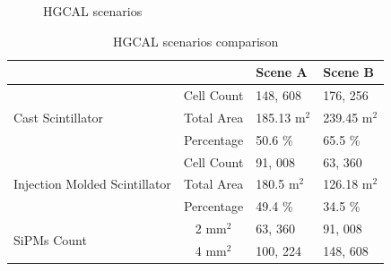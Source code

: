 \begin{figure}[!ht]
\begin{minipage}[c]{0.49\textwidth}
  \end{minipage}
  \caption[\gls{HGCAL} scenarios]{\gls{HGCAL} scenarios}%
  \label{fig:hgcal-scenes-fnal-jan20}
\end{figure}

\begin{table}[!ht]
  \centering
  \caption{\gls{HGCAL} scenarios comparison}
  \begin{tabular}{p{1.5in}cll}%
    \toprule
                                                   &                    & Scene A                & Scene B                \\
    \midrule
    \multirow{3}{=}{Cast Scintillator}             & Cell Count         & 148, 608               & 176, 256               \\
                                                   & Total Area         & 185.13 \(\text{m}^2 \) & 239.45 \(\text{m}^2 \) \\
                                                   & Percentage         & 50.6 \%                & 65.5 \%                \\
    \cmidrule(lr){2-4}
    \multirow{3}{=}{Injection Molded Scintillator} & Cell Count         & 91, 008                & 63, 360                \\
                                                   & Total Area         & 180.5 \(\text{m}^2 \)  & 126.18 \(\text{m}^2 \) \\
                                                   & Percentage         & 49.4 \%                & 34.5 \%                \\
    \cmidrule(lr){2-4}
    \multirow{2}{=}{SiPMs Count}                   & 2 \(\text{mm}^2 \) & 63, 360                & 91, 008                \\
                                                   & 4 \(\text{mm}^2 \) & 100, 224               & 148, 608               \\
    \bottomrule
  \end{tabular}
\end{table}
